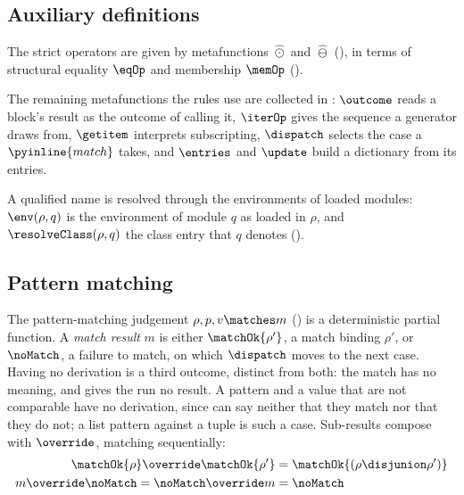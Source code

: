 \subsection{Auxiliary definitions}

\begin{PaperOnly}
The strict operators are given by metafunctions $\hat{\odot}$ and $\hat{\ominus}$ (), in
terms of structural equality $\eqOp$ and membership $\memOp$ ().






The remaining metafunctions the rules use are collected in : $\outcome$ reads a
block's result as the outcome of calling it, $\iterOp$ gives the sequence a generator draws from, $\getitem$
interprets subscripting, $\dispatch$ selects the case a $\pyinline{match}$ takes, and $\entries$ and
$\update$ build a dictionary from its entries.


\end{PaperOnly}
\begin{PaperOnly}
A qualified name is resolved through the environments of loaded modules: $\env(\rho, q)$ is the
environment of module $q$ as loaded in $\rho$, and $\resolveClass(\rho, q)$ the class entry that $q$
denotes ().


\end{PaperOnly}

\subsection{Pattern matching}

The pattern-matching judgement $\rho, p, v \matches m$ () is a deterministic partial
function. A \emph{match result} $m$ is either $\matchOk{\rho'}$, a match binding $\rho'$, or
$\noMatch$, a failure to match, on which $\dispatch$ moves to the next case. Having no derivation is a third
outcome, distinct from both: the match has no meaning, and \PurePy gives the run no result. A pattern and a
value that are not comparable have no derivation, since \PurePy can say neither that they match nor that
they do not; a list pattern against a tuple is such a case. Sub-results compose with $\override$, matching
sequentially:
{\small
\begin{align*}
\matchOk{\rho} \override \matchOk{\rho'} & {}= \matchOk{(\rho \disjunion \rho')} \\
m \override \noMatch = \noMatch \override m & {}= \noMatch
\end{align*}}

